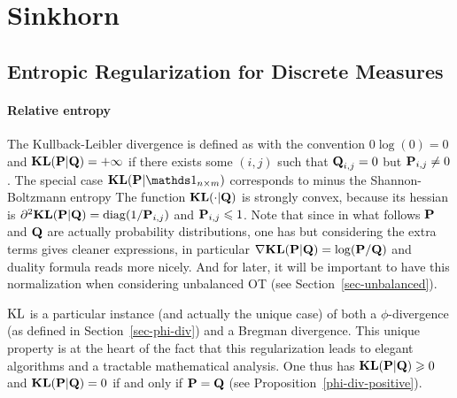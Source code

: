 

\section{Sinkhorn}

\subsection{Entropic Regularization for Discrete Measures}


\paragraph{Relative entropy}

The Kullback-Leibler divergence is defined as
with the convention $0\log(0)=0$ and $\KLD(\P|\Q)=+\infty$ if there exists some $(i,j)$ such that $\Q_{i,j}=0$ but $\P_{i,j} \neq 0$. 
%
The special case $\KLD(\P|\ones_{n \times m})$ corresponds to minus the Shannon-Boltzmann entropy
%
The function $\KLD(\cdot|\Q)$ is strongly convex, because its hessian is $\partial^2 \KLD(\P|\Q)=\diag(1/\P_{i,j})$ and $\P_{i,j} \leq 1$. 
%
Note that since in what follows $\P$ and $\Q$ are actually probability distributions, one has 
but considering the extra terms gives cleaner expressions, in particular $\nabla \KLD(\P|\Q) = \log(\P/\Q)$ and duality formula reads more nicely. And for later, it will be important to have this normalization when considering unbalanced OT (see Section~\ref{sec-unbalanced}).

$\KL$ is a particular instance (and actually the unique case) of both a $\phi$-divergence (as defined in Section~\ref{sec-phi-div}) and a Bregman divergence. This unique property is at the heart of the fact that this regularization leads to elegant algorithms and a tractable mathematical analysis. One thus has $\KLD(\P|\Q) \geq 0$ and  $\KLD(\P|\Q)=0$ if and only if $\P=\Q$ (see Proposition~\ref{phi-div-positive}).


